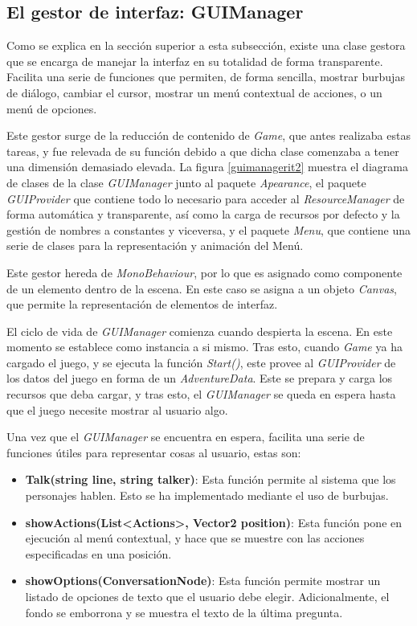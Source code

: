 \newpage

\subsection{El gestor de interfaz: GUIManager}

Como se explica en la sección superior a esta subsección, existe una clase gestora que se encarga de manejar la interfaz en su totalidad de forma transparente. Facilita una serie de funciones que permiten, de forma sencilla, mostrar burbujas de diálogo, cambiar el cursor, mostrar un menú contextual de acciones, o un menú de opciones.

Este gestor surge de la reducción de contenido de \textit{Game}, que antes realizaba estas tareas, y fue relevada de su función debido a que dicha clase comenzaba a tener una dimensión demasiado elevada. La figura \ref{guimanagerit2} muestra el diagrama de clases de la clase \textit{GUIManager} junto al paquete \textit{Apearance}, el paquete \textit{GUIProvider} que contiene todo lo necesario para acceder al \textit{ResourceManager} de forma automática y transparente, así como la carga de recursos por defecto y la gestión de nombres a constantes y viceversa, y el paquete \textit{Menu}, que contiene una serie de clases para la representación y animación del Menú.

Este gestor hereda de \textit{MonoBehaviour}, por lo que es asignado como componente de un elemento dentro de la escena. En este caso se asigna a un objeto \textit{Canvas}, que permite la representación de elementos de interfaz. 

El ciclo de vida de \textit{GUIManager} comienza cuando despierta la escena. En este momento se establece como instancia a si mismo. Tras esto, cuando \textit{Game} ya ha cargado el juego, y se ejecuta la función \textit{Start()}, este provee al \textit{GUIProvider} de los datos del juego en forma de un \textit{AdventureData}. Este se prepara y carga los recursos que deba cargar, y tras esto, el \textit{GUIManager} se queda en espera hasta que el juego necesite mostrar al usuario algo.

Una vez que el \textit{GUIManager} se encuentra en espera, facilita una serie de funciones útiles para representar cosas al usuario, estas son:
\begin{itemize}
	\item \textbf{Talk(string line, string talker)}: Esta función permite al sistema que los personajes hablen. Esto se ha implementado mediante el uso de burbujas.
	
	\item \textbf{showActions(List<Actions>, Vector2 position)}: Esta función pone en ejecución al menú contextual, y hace que se muestre con las acciones especificadas en una posición.
	
	\item \textbf{showOptions(ConversationNode)}: Esta función permite mostrar un listado de opciones de texto que el usuario debe elegir. Adicionalmente, el fondo se emborrona y se muestra el texto de la última pregunta.
	
\end{itemize}


